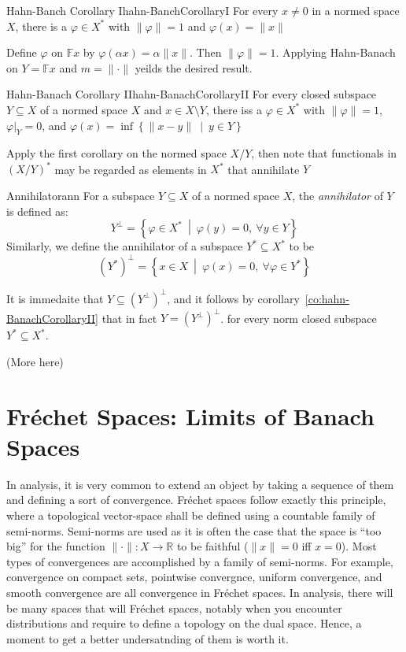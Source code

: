 \documentclass[oneside]{book}
\newcommand{\F}{\mathbb{F}}
\newcommand{\R}{\mathbb{R}}
\newcommand{\sse}{\subseteq}
\renewcommand{\phi}{\varphi}
\newcommand{\set}[2]{\left\{#1 \ \middle|\ #2\right\}}
\begin{document}
\begin{cor}{Hahn-Banch Corollary I}{hahn-BanchCorollaryI}
	For every $x \ne 0$ in a normed space $X$, there is a $\phi \in X^*$ with $\|\phi\| = 1$ and $\phi(x) = \|x\|$
\end{cor}

\begin{Proof}
	Define $\phi$ on $\F x$ by $\phi(\alpha x) = \alpha\|x\|$. Then $\|\phi\| = 1$. Applying Hahn-Banach on $Y
	= \F x$ and $m = \|\cdot\|$ yeilds the desired result.
\end{Proof}

\begin{cor}{Hahn-Banach Corollary II}{hahn-BanachCorollaryII}
	For every closed subspace $Y \sse X$ of a normed space $X$ and $x \in X\setminus Y$, there iss a $\phi \in
	X^*$ with $\|\phi\| = 1$, $\phi|_{Y} = 0$, and $\phi(x) = \inf\set{\|x-y\|}{y \in Y}$
\end{cor}

\begin{Proof}
	Apply the first corollary on the normed space $X/Y$, then note that functionals in $(X/Y)^*$ may be regarded
	as elements in $X^*$ that annihilate $Y$
\end{Proof}


\begin{defn}{Annihilator}{ann}
	For a subspace $Y \sse X$ of a normed space $X$, the \emph{annihilator} of $Y$ is defined as:
	\[
		Y^\perp = \set{\phi \in X^*}{\phi(y) = 0,\ \forall y \in Y}
	\]
	Similarly, we define the annihilator of a subspace $Y^* \sse X^*$ to be
	\[
		(Y^*)^\perp = \set{x \in X}{\phi(x) = 0,\ \forall \phi \in Y^*}
	\]
\end{defn}

It is immedaite that $Y \sse (Y^\perp)^\perp$, and it follows by corollary~\ref{co:hahn-BanachCorollaryII} that in fact
$Y = (Y^\perp)^\perp$. for every norm closed subspace $Y^* \sse X^*$.

(More here)



\section{Fr\'echet Spaces: Limits of Banach Spaces}

In analysis, it is very common to extend an object by taking a sequence of them and defining a sort of
convergence. Fr\'echet spaces follow exactly this principle, where a topological vector-space shall be defined
using a countable family of semi-norms. Semi-norms are used as it is often the case that the space is ``too
big'' for the function $\|\cdot\|: X \to \R$ to be faithful ($\|x\| = 0$ iff $x = 0$). Most types of
convergences are accomplished by a family of semi-norms. For example, convergence on compact sets,
pointwise convergnce, uniform convergence, and smooth convergence are all convergence in Fr\'echet spaces. In analysis,
there will be many spaces that will Fr\'echet spaces, notably when you encounter distributions and require to define
a topology on the dual space. Hence, a moment to get a better undersatnding of them is worth it.
\end{document}
